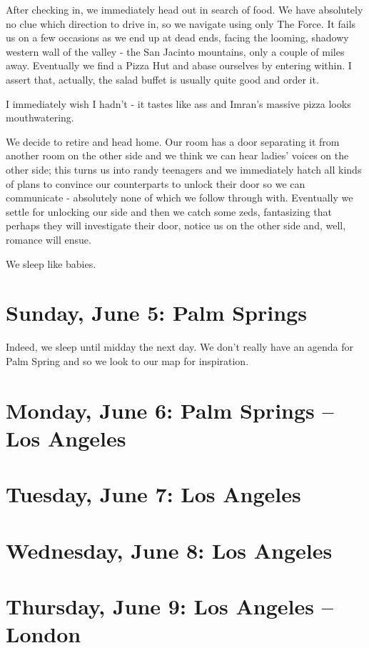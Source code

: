 \documentclass[a5paper,titlepage,draft]{book}
\begin{document}
After checking in, we immediately head out in search of food.  We have absolutely no clue which direction to drive in, so we navigate using only The Force.  It fails us on a few occasions as we end up at dead ends, facing the looming, shadowy western wall of the valley - the San Jacinto mountains, only a couple of miles away.  Eventually we find a Pizza Hut and abase ourselves by entering within.  I assert that, actually, the salad buffet is usually quite good and order it.

I immediately wish I hadn't - it tastes like ass and Imran's massive pizza looks mouthwatering.

We decide to retire and head home.  Our room has a door separating it from another room on the other side and we think we can hear ladies' voices on the other side; this turns us into randy teenagers and we immediately hatch all kinds of plans to convince our counterparts to unlock their door so we can communicate - absolutely none of which we follow through with.  Eventually we settle for unlocking our side and then we catch some zeds, fantasizing that perhaps they will investigate their door, notice us on the other side and, well, romance will ensue.

We sleep like babies.

\chapter[Palm Springs]{Sunday, June 5:  Palm Springs}
Indeed, we sleep until midday the next day.  We don't really have an agenda for Palm Spring and so we look to our map for inspiration.
\chapter[Palm Springs -- Los Angeles]{Monday, June 6:  Palm Springs -- Los Angeles}
\chapter[Los Angeles]{Tuesday, June 7:  Los Angeles}
\chapter[Los Angeles]{Wednesday, June 8: Los Angeles}
\chapter[Los Angeles -- London]{Thursday, June 9: Los Angeles -- London}
\end{document}
